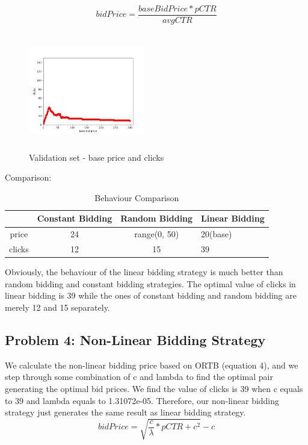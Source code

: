 \documentclass{sig-alternate-05-2015}
\begin{document}
\begin{equation}bidPrice=\frac{baseBidPrice*pCTR}{avgCTR}\end{equation}

\begin{figure}
\centering
\includegraphics[height=2in, width=2in]{images/base_bid_price.png}
\caption{Validation set - base price and clicks}
\end{figure}

Comparison:
\begin{table}
\centering
\caption{Behaviour Comparison}
\begin{tabular}{|c|c|c|l|} \hline
&Constant Bidding&Random Bidding&Linear Bidding\\ \hline
price&24&range(0, 50)&20(base)\\ \hline
clicks&12& 15&39\\
\hline\end{tabular}
\end{table}

Obviously, the behaviour of the linear bidding strategy is much better than random bidding and constant bidding strategies. The optimal value of clicks in linear bidding is 39 while the ones of constant bidding and random bidding are merely 12 and 15 separately.

\subsection{Problem 4: Non-Linear Bidding Strategy}
We calculate the non-linear bidding price based on ORTB (equation 4), and we step through some combination of c and lambda to find the optimal pair generating the optimal bid prices. We find the value of clicks is 39 when c equals to 39 and lambda equals to 1.31072e-05. Therefore, our non-linear bidding strategy just generates the same result as linear bidding strategy.
\begin{equation}bidPrice=\sqrt{\frac{c}{\lambda} * pCTR + c^2} - c\end{equation}
\end{document}
